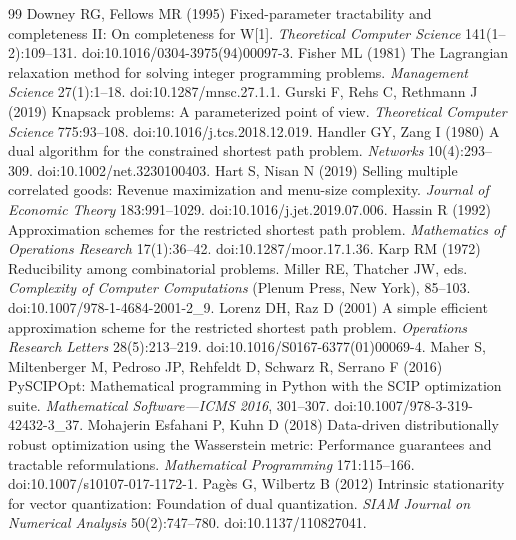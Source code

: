 \documentclass[11pt,letterpaper]{article}
\theoremstyle{definition}\newtheorem{remark}[theorem]{Remark}
\begin{document}
\begin{thebibliography}{99}
Downey RG, Fellows MR (1995) Fixed-parameter tractability and completeness II: On completeness for W[1]. \emph{Theoretical Computer Science} 141(1--2):109--131. doi:10.1016/0304-3975(94)00097-3.
Fisher ML (1981) The Lagrangian relaxation method for solving integer programming problems. \emph{Management Science} 27(1):1--18. doi:10.1287/mnsc.27.1.1.
Gurski F, Rehs C, Rethmann J (2019) Knapsack problems: A parameterized point of view. \emph{Theoretical Computer Science} 775:93--108. doi:10.1016/j.tcs.2018.12.019.
Handler GY, Zang I (1980) A dual algorithm for the constrained shortest path problem. \emph{Networks} 10(4):293--309. doi:10.1002/net.3230100403.
Hart S, Nisan N (2019) Selling multiple correlated goods: Revenue maximization and menu-size complexity. \emph{Journal of Economic Theory} 183:991--1029. doi:10.1016/j.jet.2019.07.006.
Hassin R (1992) Approximation schemes for the restricted shortest path problem. \emph{Mathematics of Operations Research} 17(1):36--42. doi:10.1287/moor.17.1.36.
Karp RM (1972) Reducibility among combinatorial problems. Miller RE, Thatcher JW, eds. \emph{Complexity of Computer Computations} (Plenum Press, New York), 85--103. doi:10.1007/978-1-4684-2001-2\_9.
Lorenz DH, Raz D (2001) A simple efficient approximation scheme for the restricted shortest path problem. \emph{Operations Research Letters} 28(5):213--219. doi:10.1016/S0167-6377(01)00069-4.
Maher S, Miltenberger M, Pedroso JP, Rehfeldt D, Schwarz R, Serrano F (2016) PySCIPOpt: Mathematical programming in Python with the SCIP optimization suite. \emph{Mathematical Software---ICMS 2016}, 301--307. doi:10.1007/978-3-319-42432-3\_37.
Mohajerin Esfahani P, Kuhn D (2018) Data-driven distributionally robust optimization using the Wasserstein metric: Performance guarantees and tractable reformulations. \emph{Mathematical Programming} 171:115--166. doi:10.1007/s10107-017-1172-1.
Pag\`es G, Wilbertz B (2012) Intrinsic stationarity for vector quantization: Foundation of dual quantization. \emph{SIAM Journal on Numerical Analysis} 50(2):747--780. doi:10.1137/110827041.

\end{thebibliography}
\end{document}
